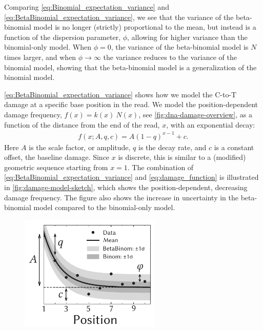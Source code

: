 Comparing \autoref{eq:Binomial_expectation_variance} and \autoref{eq:BetaBinomial_expectation_variance}, we see that the variance of the beta-binomial model is no longer (strictly) proportional to the mean, but instead is a function of the dispersion parameter, $\phi$, allowing for higher variance than the binomial-only model. When $\phi = 0$, the variance of the beta-binomial model is $N$ times larger, and when $\phi \rightarrow \infty$ the variance reduces to the variance of the binomial model, showing that the beta-binomial model is a generalization of the binomial model.

\autoref{eq:BetaBinomial_expectation_variance} shows how we model the C-to-T damage at a specific base position in the read. We model the position-dependent damage frequency, $f(x) = k(x) \ N(x)$, see \autoref{fig:dna-damage-overview}, as a function of the distance from the end of the read, $x$, with an exponential decay:
\begin{align}
    f(x; A, q, c) = A(1-q)^{x-1} + c.
    \label{eq:damage_function}
\end{align}
Here $A$ is the scale factor, or amplitude, $q$ is the decay rate, and $c$ is a constant offset, the baseline damage. Since $x$ is discrete, this is similar to a (modified) geometric sequence starting from $x=1$. The combination of \autoref{eq:BetaBinomial_expectation_variance} and \autoref{eq:damage_function} is illustrated in \autoref{fig:damage-model-sketch}, which shows the position-dependent, decreasing damage frequency. The figure also shows the increase in uncertainty in the beta-binomial model compared to the binomial-only model.
\begin{figure}[htbp]
    \centering
    \includegraphics[width=0.6\textwidth]{figures/damage_sketch_new.pdf}
\end{figure}

